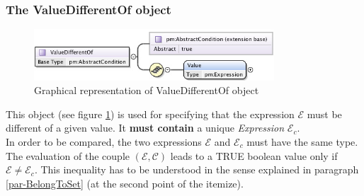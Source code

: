 \documentclass[a4paper,11pt] {article}
\begin{document}
\subsubsection{The ValueDifferentOf object}
\begin{figure}[htbp]
\begin{center}
\includegraphics[width=0.8\textwidth]{pictures/ValueDifferentOf.jpg} 
\caption{Graphical representation of ValueDifferentOf object}
\label{Pic-ValueDifferentOf}
\end{center}
\end{figure}
This object (see figure \ref{Pic-ValueDifferentOf}) is used for specifying that the expression
$\mathcal E$ must be different of a given value.
It {\bf must contain} a unique {\it Expression} $\mathcal E_c$.\\
In order to be compared, the two expressions $\mathcal E$ and $\mathcal E_c$ must have the same
type.
The evaluation of the couple $(\mathcal E, \mathcal C)$  leads to a TRUE boolean value only if
$\mathcal E \neq \mathcal E_c$. This inequality has to be understood in the sense explained in
paragraph \ref{par-BelongToSet} (at the second point of the itemize).
\end{document}
